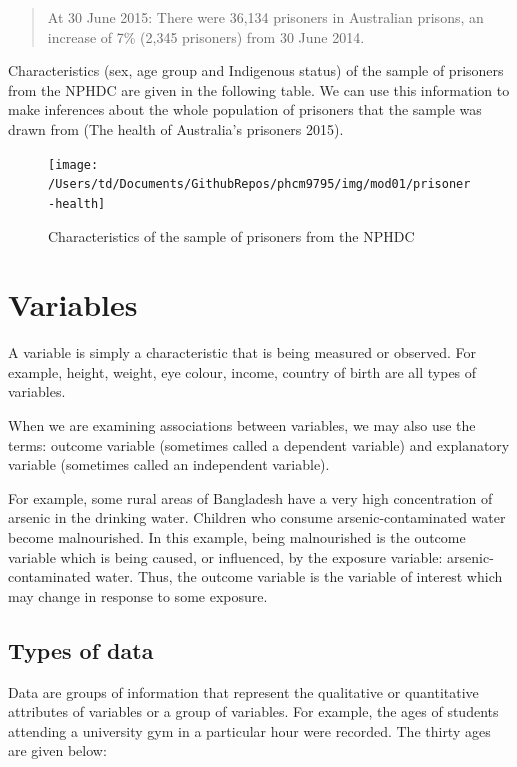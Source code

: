 \documentclass[
]{memoir}
\begin{document}
\begin{quote}
At 30 June 2015: There were 36,134 prisoners in Australian prisons, an increase of 7\% (2,345 prisoners) from 30 June 2014.
\end{quote}

Characteristics (sex, age group and Indigenous status) of the sample of prisoners from the NPHDC are given in the following table. We can use this information to make inferences about the whole population of prisoners that the sample was drawn from (The health of Australia's prisoners 2015).

\begin{figure}[H]
\texttt{[image: /Users/td/Documents/GithubRepos/phcm9795/img/mod01/prisoner-health]} \caption{Characteristics of the sample of prisoners from the NPHDC}\label{fig:fig1-2}
\end{figure}

\hypertarget{variables}{%
\section{Variables}\label{variables}}

A variable is simply a characteristic that is being measured or observed. For example, height, weight, eye colour, income, country of birth are all types of variables.

When we are examining associations between variables, we may also use the terms: outcome variable (sometimes called a dependent variable) and explanatory variable (sometimes called an independent variable).

For example, some rural areas of Bangladesh have a very high concentration of arsenic in the drinking water. Children who consume arsenic-contaminated water become malnourished. In this example, being malnourished is the outcome variable which is being caused, or influenced, by the exposure variable: arsenic-contaminated water. Thus, the outcome variable is the variable of interest which may change in response to some exposure.

\hypertarget{types-of-data}{%
\subsection{Types of data}\label{types-of-data}}

Data are groups of information that represent the qualitative or quantitative attributes of variables or a group of variables. For example, the ages of students attending a university gym in a particular hour were recorded. The thirty ages are given below:
\end{document}
